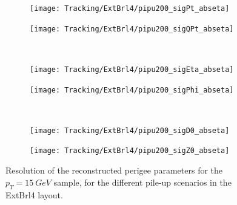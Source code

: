 \documentclass[a4paper,twoside,12pt]{article}
\begin{document}
\begin{figure}
\begin{subfigure}{.5\linewidth}
\texttt{[image: Tracking/ExtBrl4/pipu200\_sigPt\_abseta]}
\caption{}
\label{fig:tracking:pi15_sigPt_abseta}
\end{subfigure}
\begin{subfigure}{.5\linewidth}
\texttt{[image: Tracking/ExtBrl4/pipu200\_sigQPt\_abseta]}
\caption{}
\label{fig:tracking:pi15_sigQPt_abseta_ExtBrl4}
\end{subfigure}\\[1ex]
\begin{subfigure}{.5\linewidth}
\texttt{[image: Tracking/ExtBrl4/pipu200\_sigEta\_abseta]}
\caption{}
\label{fig:tracking:pi15_sigEta_abseta_ExtBrl4}
\end{subfigure}
\begin{subfigure}{.5\linewidth}
\texttt{[image: Tracking/ExtBrl4/pipu200\_sigPhi\_abseta]}
\caption{}
\label{fig:tracking:pi15_sigPhi_abseta_ExtBrl4}
\end{subfigure}\\[1ex]
\begin{subfigure}{.5\linewidth}
\texttt{[image: Tracking/ExtBrl4/pipu200\_sigD0\_abseta]}
\caption{}
\label{fig:tracking:pi15_sigD0_abseta_ExtBrl4}
\end{subfigure}
\begin{subfigure}{.5\linewidth}
\texttt{[image: Tracking/ExtBrl4/pipu200\_sigZ0\_abseta]}
\caption{}
\label{fig:tracking:pi15_sigZ0_abseta_ExtBrl4}
\end{subfigure}
\caption{Resolution of the reconstructed perigee parameters for the $p_{T} = 15\ GeV$ sample, for the different pile-up scenarios in the ExtBrl4 layout.}
\label{fig:tracking:resolutionPileup_ExtBrl4}
\end{figure}
\end{document}
